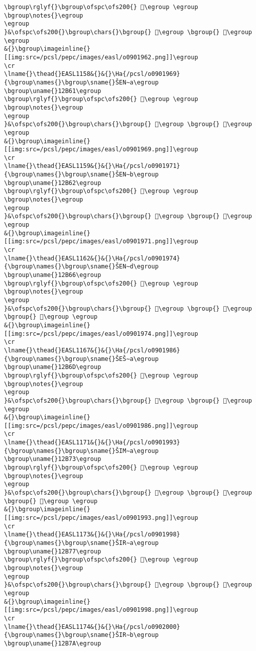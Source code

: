 \begin{verbatim}
\bgroup\rglyf{}\bgroup\ofspc\ofs200{} 𒭜\egroup \egroup
\bgroup\notes{}\egroup
\egroup
}&\ofspc\ofs200{}\bgroup\chars{}\bgroup{} 𒭚\egroup \bgroup{} 𒭜\egroup \egroup
&{}\bgroup\imageinline{}[[img:src=/pcsl/pepc/images/easl/o0901962.png]]\egroup
\cr
\lname{}\thead{}EASL1158&{}&{}\Ha{/pcsl/o0901969}{\bgroup\names{}\bgroup\sname{}ŠEN∼a\egroup
\bgroup\uname{}12B61\egroup
\bgroup\rglyf{}\bgroup\ofspc\ofs200{} 𒭡\egroup \egroup
\bgroup\notes{}\egroup
\egroup
}&\ofspc\ofs200{}\bgroup\chars{}\bgroup{} 𒭠\egroup \bgroup{} 𒭡\egroup \egroup
&{}\bgroup\imageinline{}[[img:src=/pcsl/pepc/images/easl/o0901969.png]]\egroup
\cr
\lname{}\thead{}EASL1159&{}&{}\Ha{/pcsl/o0901971}{\bgroup\names{}\bgroup\sname{}ŠEN∼b\egroup
\bgroup\uname{}12B62\egroup
\bgroup\rglyf{}\bgroup\ofspc\ofs200{} 𒭢\egroup \egroup
\bgroup\notes{}\egroup
\egroup
}&\ofspc\ofs200{}\bgroup\chars{}\bgroup{} 𒭢\egroup \bgroup{} 𒭣\egroup \egroup
&{}\bgroup\imageinline{}[[img:src=/pcsl/pepc/images/easl/o0901971.png]]\egroup
\cr
\lname{}\thead{}EASL1162&{}&{}\Ha{/pcsl/o0901974}{\bgroup\names{}\bgroup\sname{}ŠEN∼d\egroup
\bgroup\uname{}12B66\egroup
\bgroup\rglyf{}\bgroup\ofspc\ofs200{} 𒭦\egroup \egroup
\bgroup\notes{}\egroup
\egroup
}&\ofspc\ofs200{}\bgroup\chars{}\bgroup{} 𒭦\egroup \bgroup{} 𒭨\egroup \bgroup{} 𒭩\egroup \egroup
&{}\bgroup\imageinline{}[[img:src=/pcsl/pepc/images/easl/o0901974.png]]\egroup
\cr
\lname{}\thead{}EASL1167&{}&{}\Ha{/pcsl/o0901986}{\bgroup\names{}\bgroup\sname{}ŠEŠ∼a\egroup
\bgroup\uname{}12B6D\egroup
\bgroup\rglyf{}\bgroup\ofspc\ofs200{} 𒭭\egroup \egroup
\bgroup\notes{}\egroup
\egroup
}&\ofspc\ofs200{}\bgroup\chars{}\bgroup{} 𒭭\egroup \bgroup{} 𒭮\egroup \egroup
&{}\bgroup\imageinline{}[[img:src=/pcsl/pepc/images/easl/o0901986.png]]\egroup
\cr
\lname{}\thead{}EASL1171&{}&{}\Ha{/pcsl/o0901993}{\bgroup\names{}\bgroup\sname{}ŠIM∼a\egroup
\bgroup\uname{}12B73\egroup
\bgroup\rglyf{}\bgroup\ofspc\ofs200{} 𒭳\egroup \egroup
\bgroup\notes{}\egroup
\egroup
}&\ofspc\ofs200{}\bgroup\chars{}\bgroup{} 𒭲\egroup \bgroup{} 𒭳\egroup \bgroup{} 𒭴\egroup \egroup
&{}\bgroup\imageinline{}[[img:src=/pcsl/pepc/images/easl/o0901993.png]]\egroup
\cr
\lname{}\thead{}EASL1173&{}&{}\Ha{/pcsl/o0901998}{\bgroup\names{}\bgroup\sname{}ŠIR∼a\egroup
\bgroup\uname{}12B77\egroup
\bgroup\rglyf{}\bgroup\ofspc\ofs200{} 𒭷\egroup \egroup
\bgroup\notes{}\egroup
\egroup
}&\ofspc\ofs200{}\bgroup\chars{}\bgroup{} 𒭶\egroup \bgroup{} 𒭷\egroup \egroup
&{}\bgroup\imageinline{}[[img:src=/pcsl/pepc/images/easl/o0901998.png]]\egroup
\cr
\lname{}\thead{}EASL1174&{}&{}\Ha{/pcsl/o0902000}{\bgroup\names{}\bgroup\sname{}ŠIR∼b\egroup
\bgroup\uname{}12B7A\egroup

\end{verbatim}
